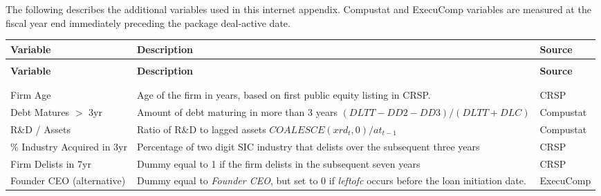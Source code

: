 \bgroup
\singlespacing

The following describes the additional variables used in this internet appendix.
Compustat and ExecuComp variables are measured at the fiscal year end immediately preceding the package deal-active date.

\begin{center}
	\centering
    \footnotesize
	\begin{longtable*}{>{\raggedright\let\newline\\\arraybackslash\hspace{0pt}}p{.2 \textwidth} >{\raggedright\let\newline\\\arraybackslash\hspace{0pt}}p{.55 \textwidth} >{\raggedright\let\newline\\\arraybackslash\hspace{0pt}}p{.16 \textwidth}}
        \toprule
		\textbf{Variable} 	& \textbf{Description} & \textbf{Source} \\ \midrule
		\endfirsthead
		 \\
		\toprule
		\textbf{Variable} 	& \textbf{Description} & \textbf{Source} \\ \midrule
		\endhead
		\midrule
		 \\
		\endfoot
		\bottomrule
		\endlastfoot
 \\ \addlinespace
Firm Age & Age of the firm in years, based on first public equity listing in CRSP. & CRSP \\
Debt Matures $ > $ 3yr         & Amount of debt maturing in more than 3 years $(DLTT - DD2 - DD3)/(DLTT + DLC)$ & Compustat \\ %
R\&D / Assets                  & Ratio of R\&D to lagged assets $ COALESCE(xrd_{t}, 0) / at_{t-1} $   & Compustat \\
\% Industry Acquired in 3yr    & Percentage of two digit SIC industry that delists over the subsequent three years & CRSP \\
Firm Delists in 7yr            & Dummy equal to 1 if the firm delists in the subsequent seven years & CRSP \\
Founder CEO (alternative)      & Dummy equal to \textit{Founder CEO}, but set to 0 if \textit{leftofc} occurs before the loan initiation date. & ExecuComp \\

\end{longtable*}
\end{center}
